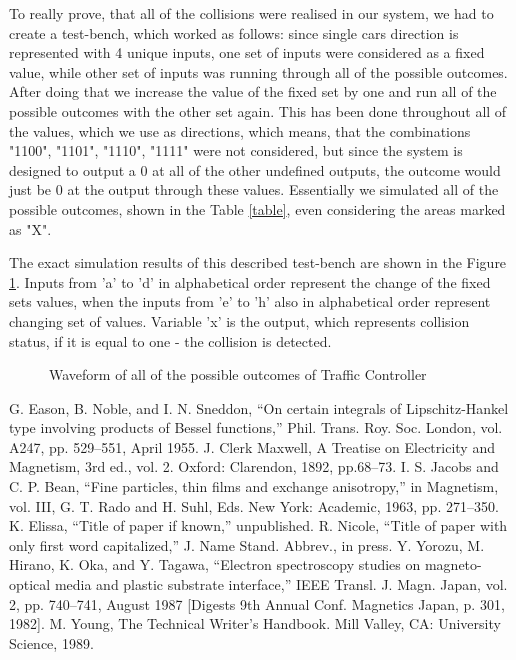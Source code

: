 \documentclass[conference]{IEEEtran}
\begin{document}
To really prove, that all of the collisions were realised in our system, we had to create a test-bench, which worked as follows: since single cars direction is represented with 4 unique inputs, one set of inputs were considered as a fixed value, while other set of inputs was running through all of the possible outcomes. After doing that we increase the value of the fixed set by one and run all of the possible outcomes with the other set again. This has been done throughout all of the values, which we use as directions, which means, that the combinations "1100", "1101", "1110", "1111" were not considered, but since the system is designed to output a 0 at all of the other undefined outputs, the outcome would just be 0 at the output through these values. Essentially we simulated all of the possible outcomes, shown in the Table \ref{table}, even considering the areas marked as "X".

The exact simulation results of this described test-bench are shown in the Figure \ref{testbench}. Inputs from 'a' to 'd' in alphabetical order represent the change of the fixed sets values, when the inputs from 'e' to 'h' also in alphabetical order represent changing set of values. Variable 'x' is the output, which represents collision status, if it is equal to one - the collision is detected.
\begin{figure}[ht]
    \caption{Waveform of all of the possible outcomes of Traffic Controller}
    \label{testbench}
\end{figure}

\begin{thebibliography}{00}
 G. Eason, B. Noble, and I. N. Sneddon, ``On certain integrals of Lipschitz-Hankel type involving products of Bessel functions,'' Phil. Trans. Roy. Soc. London, vol. A247, pp. 529--551, April 1955.
 J. Clerk Maxwell, A Treatise on Electricity and Magnetism, 3rd ed., vol. 2. Oxford: Clarendon, 1892, pp.68--73.
 I. S. Jacobs and C. P. Bean, ``Fine particles, thin films and exchange anisotropy,'' in Magnetism, vol. III, G. T. Rado and H. Suhl, Eds. New York: Academic, 1963, pp. 271--350.
 K. Elissa, ``Title of paper if known,'' unpublished.
 R. Nicole, ``Title of paper with only first word capitalized,'' J. Name Stand. Abbrev., in press.
 Y. Yorozu, M. Hirano, K. Oka, and Y. Tagawa, ``Electron spectroscopy studies on magneto-optical media and plastic substrate interface,'' IEEE Transl. J. Magn. Japan, vol. 2, pp. 740--741, August 1987 [Digests 9th Annual Conf. Magnetics Japan, p. 301, 1982].
 M. Young, The Technical Writer's Handbook. Mill Valley, CA: University Science, 1989.
\end{thebibliography}
\end{document}
